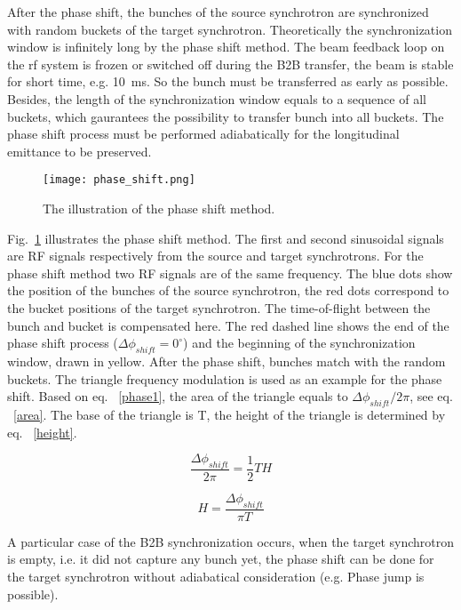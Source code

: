After the phase shift, the bunches of the source synchrotron are synchronized with random buckets of the target synchrotron. Theoretically the synchronization window is infinitely long by the phase shift method. The beam feedback loop on the rf system is frozen or switched off during the B2B transfer, the beam is stable for short time, e.g. \SI{10}{ms}. So the bunch must be transferred as early as possible. Besides, the length of the synchronization window equals to a sequence of all buckets, which gaurantees the possibility to transfer bunch into all buckets. The phase shift process must be performed adiabatically for the longitudinal emittance to be preserved. 

\begin{figure}[!htb]
   \centering   
   \texttt{[image: phase\_shift.png]}
   \caption{The illustration of the phase shift method.}
   \label{phase_shift}
\end{figure}


Fig.~\ref{phase_shift} illustrates the phase shift method. The first and second sinusoidal signals are RF signals respectively from the source and target synchrotrons. For the phase shift method two RF signals are of the same frequency. The blue dots show the position of the bunches of the source synchrotron, the red dots correspond to the bucket positions of the target synchrotron. The time-of-flight between the bunch and bucket is compensated here. The red dashed line shows the end of the phase shift process ($\Delta \phi_{shift}=0^\circ$) and the beginning of the synchronization window, drawn in yellow. After the phase shift, bunches match with the random buckets. The triangle frequency modulation is used as an example for the phase shift. Based on eq. ~\ref{phase1}, the area of the triangle equals to $\Delta \phi_{shift}/2\pi$, see eq. ~\ref{area}. The base of the triangle is T, the height of the triangle is determined by eq. ~\ref{height}.  

\begin{equation}
\frac{\Delta \phi_{shift}}{2\pi}=\frac{1}{2}TH \label{area}
\end{equation}

\begin{equation}
H= \frac{\Delta \phi_{shift}}{\pi T}\label{height}
\end{equation}

A particular case of the B2B synchronization occurs, when the target synchrotron is empty, i.e. it did not capture any bunch yet, the phase shift can be done for the target synchrotron without adiabatical consideration (e.g. Phase jump is possible).

